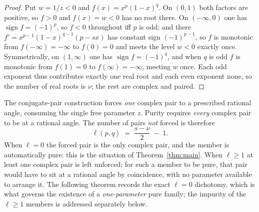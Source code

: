 \documentclass[11pt]{article}
\theoremstyle{definition}
\begin{document}
\begin{proof}
Put $w=1/z<0$ and $f(x)=x^p(1-x)^q$. On $(0,1)$ both factors are positive, so $f>0$ and
$f(x)=w<0$ has no root there. On $(-\infty,0)$ one has $\operatorname{sign}f=(-1)^p$, so $f<0$
throughout iff $p$ is odd; and there $f'=x^{p-1}(1-x)^{q-1}(p-sx)$ has constant sign
$(-1)^{p-1}$, so $f$ is monotonic from $f(-\infty)=-\infty$ to $f(0)=0$ and meets the level $w<0$
exactly once. Symmetrically, on $(1,\infty)$ one has $\operatorname{sign}f=(-1)^q$, and when $q$ is
odd $f$ is monotonic from $f(1)=0$ to $f(\infty)=-\infty$, meeting $w$ once. Each odd exponent thus
contributes exactly one real root and each even exponent none, so the number of real roots is $\nu$;
the rest are complex and paired.
\end{proof}

The conjugate-pair construction forces \emph{one} complex pair to a prescribed rational angle,
consuming the single free parameter $z$. Purity requires \emph{every} complex pair to be at a
rational angle. The number of pairs \emph{not} forced is therefore
\begin{equation}\label{eq:leftover}
  \ell(p,q)\;=\;\frac{s-\nu}{2}\;-\;1 .
\end{equation}
When $\ell=0$ the forced pair is the only complex pair, and the member is automatically pure: this is
the situation of Theorem~\ref{thm:main}. When $\ell\ge1$ at least one complex pair is left unforced;
for such a member to be pure, that pair would have to sit at a rational angle by coincidence, with no
parameter available to arrange it. The following theorem records the exact $\ell=0$ dichotomy, which
is what governs the existence of a \emph{one-parameter} pure family; the impurity of the $\ell\ge1$
members is addressed separately below.
\end{document}
